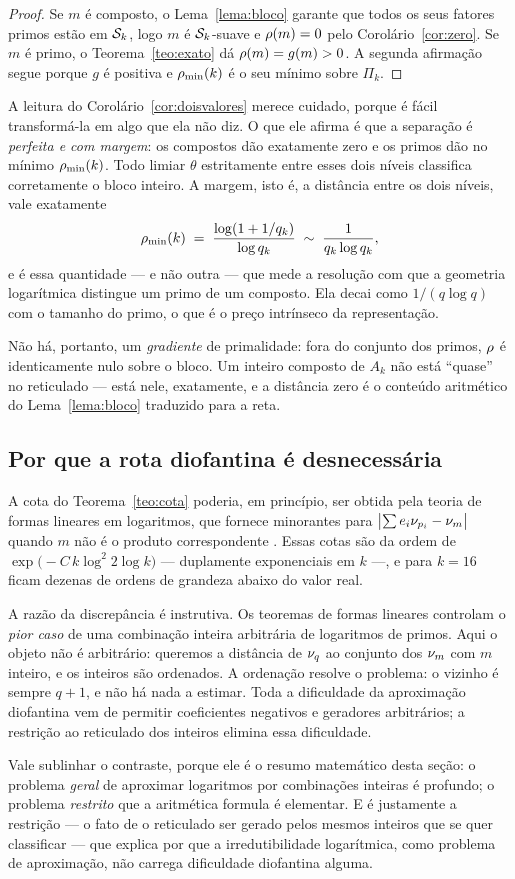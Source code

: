 \begin{proof}
Se $m$ é composto, o Lema~\ref{lema:bloco} garante que todos os seus fatores
primos estão em $\mathcal{S}_k$, logo $m$ é $\mathcal{S}_k$-suave e
$\rho(m)=0$ pelo Corolário~\ref{cor:zero}. Se $m$ é primo, o
Teorema~\ref{teo:exato} dá $\rho(m)=g(m)>0$. A segunda afirmação segue porque $g$
é positiva e $\rho_{\min}(k)$ é o seu mínimo sobre $\Pi_k$.
\end{proof}

A leitura do Corolário~\ref{cor:doisvalores} merece cuidado, porque é fácil
transformá-la em algo que ela não diz. O que ele afirma é que a separação é
\emph{perfeita e com margem}: os compostos dão exatamente zero e os primos dão no
mínimo $\rho_{\min}(k)$. Todo limiar $\theta$ estritamente entre esses dois níveis
classifica corretamente o bloco inteiro. A margem, isto é, a distância entre os
dois níveis, vale exatamente
\[
  \rho_{\min}(k) \;=\; \frac{\log(1+1/q_k)}{\log q_k} \;\sim\; \frac{1}{q_k\log q_k},
\]
e é essa quantidade — e não outra — que mede a resolução com que a geometria
logarítmica distingue um primo de um composto. Ela decai como $1/(q\log q)$ com o
tamanho do primo, o que é o preço intrínseco da representação.

Não há, portanto, um \emph{gradiente} de primalidade: fora do conjunto dos primos,
$\rho$ é identicamente nulo sobre o bloco. Um inteiro composto de $A_k$ não está
``quase'' no reticulado — está nele, exatamente, e a distância zero é o conteúdo
aritmético do Lema~\ref{lema:bloco} traduzido para a reta.

\subsection{Por que a rota diofantina é desnecessária}

A cota do Teorema~\ref{teo:cota} poderia, em princípio, ser obtida pela teoria de
formas lineares em logaritmos, que fornece minorantes para
$\bigl|\sum e_i\nu_{p_i}-\nu_{m}\bigr|$ quando $m$ não é o produto
correspondente \cite{baker}. Essas cotas são da ordem de
$\exp\bigl(-C\,k\log^2 2\log k\bigr)$ — duplamente exponenciais em $k$ —, e para
$k=16$ ficam dezenas de ordens de grandeza abaixo do valor real.

A razão da discrepância é instrutiva. Os teoremas de formas lineares controlam o
\emph{pior caso} de uma combinação inteira arbitrária de logaritmos de primos.
Aqui o objeto não é arbitrário: queremos a distância de $\nu_{q}$ ao conjunto dos
$\nu_{m}$ com $m$ inteiro, e os inteiros são ordenados. A ordenação resolve o
problema: o vizinho é sempre $q+1$, e não há nada a estimar. Toda a dificuldade da
aproximação diofantina vem de permitir coeficientes negativos e geradores
arbitrários; a restrição ao reticulado dos inteiros elimina essa dificuldade.

Vale sublinhar o contraste, porque ele é o resumo matemático desta seção: o
problema \emph{geral} de aproximar logaritmos por combinações inteiras é profundo;
o problema \emph{restrito} que a aritmética formula é elementar. E é justamente a
restrição — o fato de o reticulado ser gerado pelos mesmos inteiros que se quer
classificar — que explica por que a irredutibilidade logarítmica, como problema de
aproximação, não carrega dificuldade diofantina alguma.
